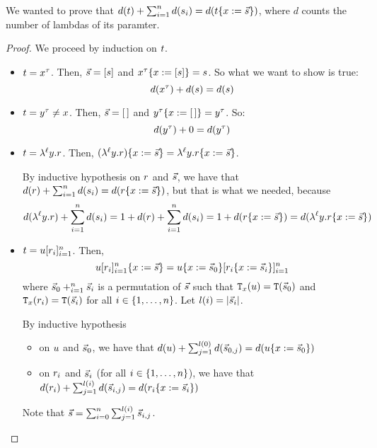 
We wanted to prove that $d(t) + \sum_{i=1}^n d(s_i) = d(t\{x := \vec{s}\})$,
where $d$ counts the number of lambdas of its paramter.

\begin{proof}
We proceed by induction on $t$.

\begin{itemize}
\item {} $t = x^\tau$.
  Then, $\vec{s} = [s]$ and 
        $x^{\tau}\{x := [s]\} = s$. So what we want to show is true:
   \[ d(x^\tau) + d(s) = d(s)\]
\item {} $t = y^\tau \neq x$.
  Then, $\vec{s} = [\,]$ and 
        $y^{\tau}\{x := [\,]\} = y^\tau$. So:
   \[ d(y^\tau) + 0 = d(y^\tau) \]
\item {} $t = \lambda^{\ell} y. r$.
Then, $(\lambda^{\ell} y. r)\{x := \vec{s}\} =
       \lambda^{\ell} y. r\{x := \vec{s}\}$.

By inductive hypothesis on $r$ and $\vec{s}$, we have that
  $d(r) + \sum_{i=1}^n d(s_i) = d(r\{x := \vec{s}\})$, but that is
what we needed, because
  \[
    d(\lambda^{\ell} y. r) + \sum_{i=1}^n d(s_i)
       = 1 + d(r) + \sum_{i=1}^n d(s_i)
       = 1 + d(r\{x := \vec{s}\})
       = d(\lambda^{\ell} y. r\{x := \vec{s}\})
  \]
\item {} $t = u [r_i]_{i=1}^{n}$. Then,
  \[
    u[r_i]_{i=1}^{n}\{x := \vec{s}\}
    =
    u\{x := \vec{s}_0\}[r_i\{x := \vec{s}_i\}]_{i=1}^{n}
  \]
  where $\vec{s}_0 +_{i=1}^{n} \vec{s}_i$ is a permutation of $\vec{s}$
  such that $\mathtt{T}_{x}(u) = \mathtt{T}(\vec{s}_0)$
  and $\mathtt{T}_{x}(r_i) = \mathtt{T}(\vec{s}_i)$ for all $i \in \{1, \hdots, n\}$.
  Let $l(i) = |\vec{s}_i|$.

By inductive hypothesis
  \begin{itemize}
    \item on $u$ and $\vec{s}_0$, we have that $d(u) + \sum_{j=1}^{l(0)} d(\vec{s}_{0, j}) = d(u\{x := \vec{s}_0\})$
    \item on $r_i$ and $\vec{s}_i$ (for all $i \in \{1, \hdots, n\}$), we have that $d(r_i) + \sum_{j=1}^{l(i)} d(\vec{s}_{i, j}) = d(r_i\{x := \vec{s}_i\})$
  \end{itemize}
Note that $\vec{s} = \sum_{i=0}^n \sum_{j=1}^{l(i)} \vec{s}_{i,j}$.


\end{itemize}
\end{proof}
